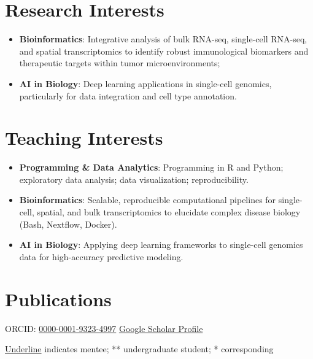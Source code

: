 \documentclass[
  11pt,
  letterpaper,
  DIV=11,
  numbers=noendperiod]{scrartcl}
\providecommand{\tightlist}{%
  \setlength{\itemsep}{0pt}\setlength{\parskip}{0pt}}
\begin{document}
\section{Research Interests}\label{research-interests}

\begin{itemize}
\item
  \textbf{Bioinformatics}: Integrative analysis of bulk RNA-seq,
  single-cell RNA-seq, and spatial transcriptomics to identify robust
  immunological biomarkers and therapeutic targets within tumor
  microenvironments;
\item
  \textbf{AI in Biology}: Deep learning applications in single-cell
  genomics, particularly for data integration and cell type annotation.
\end{itemize}

\vspace{-15pt}

\section{Teaching Interests}\label{teaching-interests}

\begin{itemize}
\tightlist
\item
  \textbf{Programming \& Data Analytics}: Programming in R and Python;
  exploratory data analysis; data visualization; reproducibility.
\item
  \textbf{Bioinformatics}: Scalable, reproducible computational
  pipelines for single-cell, spatial, and bulk transcriptomics to
  elucidate complex disease biology (Bash, Nextflow, Docker).\\
\item
  \textbf{AI in Biology}: Applying deep learning frameworks to
  single-cell genomics data for high-accuracy predictive modeling.
\end{itemize}

\section{Publications}\label{publications}

\apptocmd{\tightlist}{\setlength{\itemsep}{4pt}}{}{}

ORCID: \href{https://orcid.org/0000-0001-9323-4997}{0000-0001-9323-4997}
\textbar{}
\href{https://scholar.google.com/citations?user=9_K4ekoAAAAJ&hl=en&authuser=5}{Google
Scholar Profile}

\underline{Underline} indicates mentee; ** undergraduate student; *
corresponding
\end{document}
